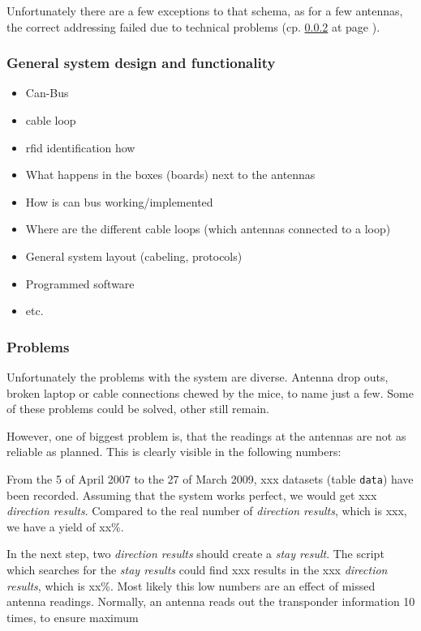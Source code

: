 Unfortunately there are a few exceptions to that schema, as for a few antennas, the correct addressing failed due to technical problems (cp. \ref{subsubsec:problems} at page \pageref{subsubsec:problems}).

\subsubsection{General system design and functionality}
\label{subsubsec:generalsystem}

\begin{itemize}
  \item Can-Bus
  \item cable loop
  \item rfid identification how
  \item What happens in the boxes (boards) next to the antennas
  \item How is can bus working/implemented
  \item Where are the different cable loops (which antennas connected to a loop)
  \item General system layout (cabeling, protocols)
  \item Programmed software
  \item etc. 
\end{itemize}

\subsubsection{Problems}
\label{subsubsec:problems}

Unfortunately the problems with the system are diverse. Antenna drop outs, broken laptop or cable connections chewed by the mice, to name just a few. Some of these problems could be solved, other still remain.

However, one of biggest problem is, that the readings at the antennas are not as reliable as planned. This is clearly visible in the following numbers:

From the 5 of April 2007 to the 27 of March 2009, xxx datasets (table \lstinline|data|) have been recorded. Assuming that the system works perfect, we would get xxx \textit{direction results}. Compared to the real number of \textit{direction results}, which is xxx, we have a yield of xx\%.

In the next step, two \textit{direction results} should create a \textit{stay result}. The script which searches for the \textit{stay results} could find xxx results in the xxx \textit{direction results}, which is xx\%. Most likely this low numbers are an effect of missed antenna readings. Normally, an antenna reads out the transponder information 10 times, to ensure maximum 

